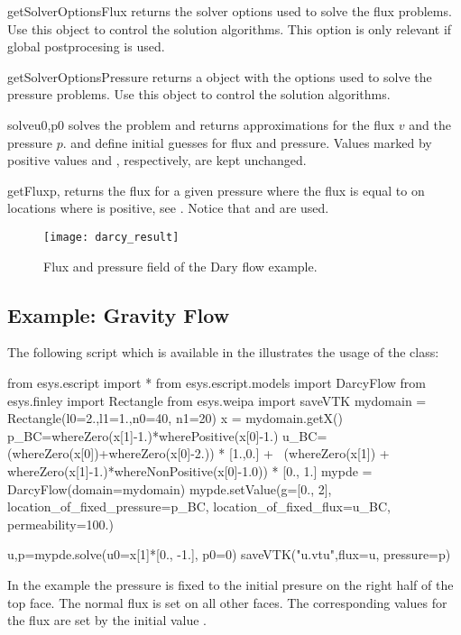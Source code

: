 \begin{methoddesc}[DarcyFlow]{getSolverOptionsFlux}{}
returns the solver options used to solve the flux problems.
Use this \SolverOptions object to control the solution algorithms.
This option is only relevant if global postprocesing is used.
\end{methoddesc}

\begin{methoddesc}[DarcyFlow]{getSolverOptionsPressure}{}
returns a \SolverOptions object with the options used to solve the pressure
problems.
Use this object to control the solution algorithms.
\end{methoddesc}

\begin{methoddesc}[DarcyFlow]{solve}{u0,p0}
solves the problem and returns approximations for the flux $v$ and the pressure $p$.
 and  define initial guesses for flux and pressure.
Values marked by positive values  and
, respectively, are kept unchanged.
\end{methoddesc}

\begin{methoddesc}[DarcyFlow]{getFlux}{p, }
returns the flux for a given pressure  where the flux is equal to 
on locations where  is positive,  see .
Notice that  and  are used.
\end{methoddesc}

\begin{figure}
\centerline{\texttt{[image: darcy\_result]}}
\caption{Flux and pressure field of the Dary flow example.}
\label{DIFFUSION FIG 1}
\end{figure}

\subsection{Example: Gravity Flow}
The following script 
which is available in the \ExampleDirectory illustrates the usage of the
 class:
\begin{python}
   from esys.escript import *
   from esys.escript.models import DarcyFlow
   from esys.finley import Rectangle
   from esys.weipa import saveVTK
   mydomain = Rectangle(l0=2.,l1=1.,n0=40, n1=20)
   x = mydomain.getX()
   p_BC=whereZero(x[1]-1.)*wherePositive(x[0]-1.)
   u_BC=(whereZero(x[0])+whereZero(x[0]-2.)) * [1.,0.] + \
     (whereZero(x[1]) + whereZero(x[1]-1.)*whereNonPositive(x[0]-1.0)) * [0., 1.]
   mypde = DarcyFlow(domain=mydomain)
   mypde.setValue(g=[0., 2],
                  location_of_fixed_pressure=p_BC,
                  location_of_fixed_flux=u_BC,
                  permeability=100.)

   u,p=mypde.solve(u0=x[1]*[0., -1.], p0=0)
   saveVTK("u.vtu",flux=u, pressure=p)
\end{python}
In the example the pressure is fixed to the initial presure  on the right half of the top face.
The normal flux is set on all other faces. The corresponding values for the flux are set by the initial value
\var{u0}.   
